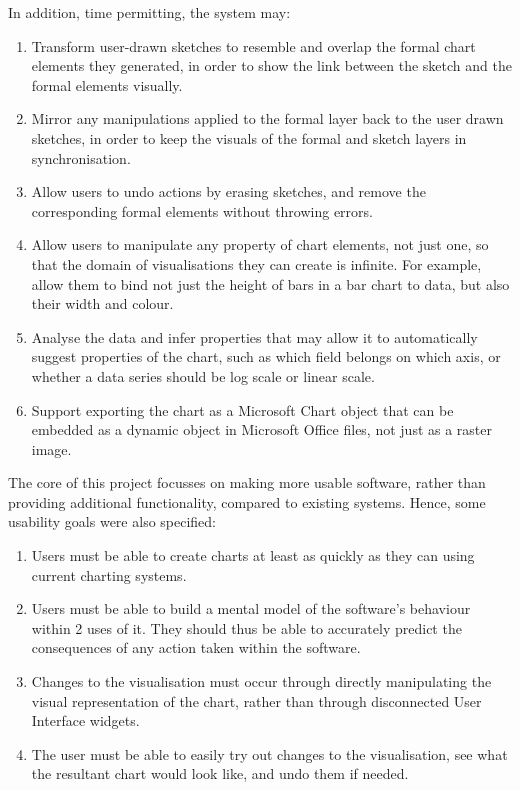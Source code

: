 	In addition, time permitting, the system may:
	\begin{enumerate}[label=\bfseries Extension \arabic*]
		\item \label{ext:transform_sketch} Transform user-drawn sketches to resemble and overlap the formal chart elements they generated, in order to show the link between the sketch and the formal elements visually.
		\item \label{ext:formal_to_informal} Mirror any manipulations applied to the formal layer back to the user drawn sketches, in order to keep the visuals of the formal and sketch layers in synchronisation.
		\item \label{ext:erase} Allow users to undo actions by erasing sketches, and remove the corresponding formal elements without throwing errors.
		\item Allow users to manipulate any property of chart elements, not just one, so that the domain of visualisations they can create is infinite. For example, allow them to bind not just the height of bars in a bar chart to data, but also their width and colour. 
		\item Analyse the data and infer properties that may allow it to automatically suggest properties of the chart, such as which field belongs on which axis, or whether a data series should be log scale or linear scale.
		\item Support exporting the chart as a Microsoft Chart object that can be embedded as a dynamic object in Microsoft Office files, not just as a raster image.
	\end{enumerate}
	
	The core of this project focusses on making more usable software, rather than providing additional functionality, compared to existing systems. Hence, some usability goals were also specified:
	\begin{enumerate}[label=\bfseries Usability \arabic*]
		\item Users must be able to create charts at least as quickly as they can using current charting systems.
		\item Users must be able to build a mental model of the software's behaviour within 2 uses of it. They should thus be able to accurately predict the consequences of any action taken within the software.
		\item Changes to the visualisation must occur through directly manipulating the visual representation of the chart, rather than through disconnected User Interface widgets.
		\item The user must be able to easily try out changes to the visualisation, see what the resultant chart would look like, and undo them if needed.
	\end{enumerate}
	
